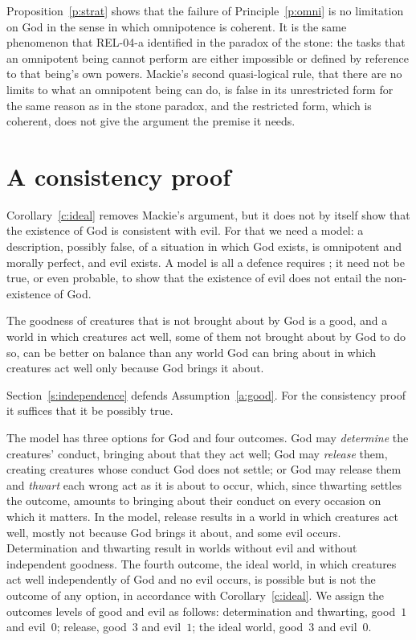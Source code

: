 \documentclass{situationist-preprint}
\begin{document}
Proposition~\ref{p:strat} shows that the failure of Principle~\ref{p:omni} is no limitation on God in the sense in which omnipotence is coherent. It is the same phenomenon that REL-04-a identified in the paradox of the stone: the tasks that an omnipotent being cannot perform are either impossible or defined by reference to that being's own powers. Mackie's second quasi-logical rule, that there are no limits to what an omnipotent being can do, is false in its unrestricted form for the same reason as in the stone paradox, and the restricted form, which is coherent, does not give the argument the premise it needs.

\section{A consistency proof}\label{s:consistency}

Corollary~\ref{c:ideal} removes Mackie's argument, but it does not by itself show that the existence of God is consistent with evil. For that we need a model: a description, possibly false, of a situation in which God exists, is omnipotent and morally perfect, and evil exists. A model is all a defence requires \citep{Plantinga1974}; it need not be true, or even probable, to show that the existence of evil does not entail the non-existence of God.

\begin{assumption}\label{a:good}
The goodness of creatures that is not brought about by God is a good, and a world in which creatures act well, some of them not brought about by God to do so, can be better on balance than any world God can bring about in which creatures act well only because God brings it about.
\end{assumption}

Section~\ref{s:independence} defends Assumption~\ref{a:good}. For the consistency proof it suffices that it be possibly true.

The model has three options for God and four outcomes. God may \emph{determine} the creatures' conduct, bringing about that they act well; God may \emph{release} them, creating creatures whose conduct God does not settle; or God may release them and \emph{thwart} each wrong act as it is about to occur, which, since thwarting settles the outcome, amounts to bringing about their conduct on every occasion on which it matters. In the model, release results in a world in which creatures act well, mostly not because God brings it about, and some evil occurs. Determination and thwarting result in worlds without evil and without independent goodness. The fourth outcome, the ideal world, in which creatures act well independently of God and no evil occurs, is possible but is not the outcome of any option, in accordance with Corollary~\ref{c:ideal}. We assign the outcomes levels of good and evil as follows: determination and thwarting, good~$1$ and evil~$0$; release, good~$3$ and evil~$1$; the ideal world, good~$3$ and evil~$0$.
\end{document}
